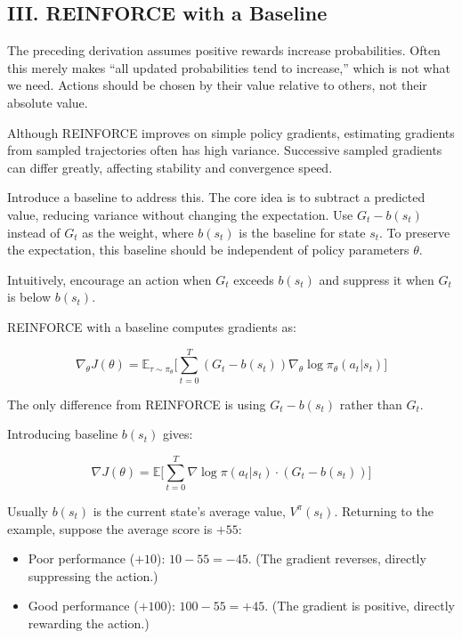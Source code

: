 \hypertarget{iii.-reinforce-with-a-baseline}{%
\subsection{III. REINFORCE with a Baseline}\label{iii.-reinforce-with-a-baseline}}

The preceding derivation assumes positive rewards increase probabilities. Often this merely makes ``all updated probabilities tend to increase,'' which is not what we need. Actions should be chosen by their value relative to others, not their absolute value.

Although REINFORCE improves on simple policy gradients, estimating gradients from sampled trajectories often has high variance. Successive sampled gradients can differ greatly, affecting stability and convergence speed.

Introduce a baseline to address this. The core idea is to subtract a predicted value, reducing variance without changing the expectation. Use \(G_t-b(s_t)\) instead of \(G_t\) as the weight, where \(b(s_t)\) is the baseline for state \(s_t\). To preserve the expectation, this baseline should be independent of policy parameters \(\theta\).

Intuitively, encourage an action when \(G_t\) exceeds \(b(s_t)\) and suppress it when \(G_t\) is below \(b(s_t)\).

REINFORCE with a baseline computes gradients as:

\[
\nabla_\theta J(\theta)
=\mathbb{E}_{\tau\sim\pi_\theta}
\bigl[
\sum_{t=0}^{T}
(G_t-b(s_t))\nabla_\theta\log\pi_\theta(a_t|s_t)
\bigr]
\]

The only difference from REINFORCE is using \(G_t-b(s_t)\) rather than \(G_t\).

Introducing baseline \(b(s_t)\) gives:

\[
\nabla J(\theta)
=\mathbb{E}
\bigl[
\sum_{t=0}^{T}
\nabla\log\pi(a_t|s_t)\cdot(G_t-b(s_t))
\bigr]
\]

Usually \(b(s_t)\) is the current state's average value, \(V^{\pi}(s_t)\). Returning to the example, suppose the average score is \(+55\):

\begin{itemize}
\tightlist
\item
  Poor performance (\(+10\)): \(10-55=-45\). (The gradient reverses, directly suppressing the action.)
\item
  Good performance (\(+100\)): \(100-55=+45\). (The gradient is positive, directly rewarding the action.)
\end{itemize}

